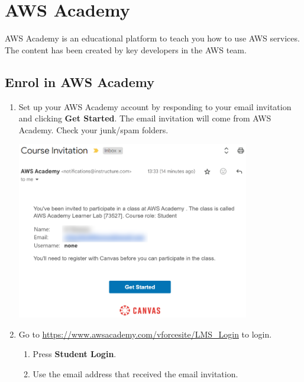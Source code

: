 \section{AWS Academy}
AWS Academy is an educational platform to teach you how to use AWS services.
The content has been created by key developers in the AWS team.

\subsection{Enrol in AWS Academy}

\begin{enumerate}
    \item
        Set up your AWS Academy account by responding to your email invitation and clicking \textbf{Get Started}.
        The email invitation will come from AWS Academy.
        Check your junk/spam folders.

        \includegraphics[width=0.8\textwidth]{images/email-invite}

    \item Go to \url{https://www.awsacademy.com/vforcesite/LMS_Login} to login.
    \begin{enumerate}
        \item Press \textbf{Student Login}.
        \item Use the email address that received the email invitation.
    \end{enumerate}


\end{enumerate}
